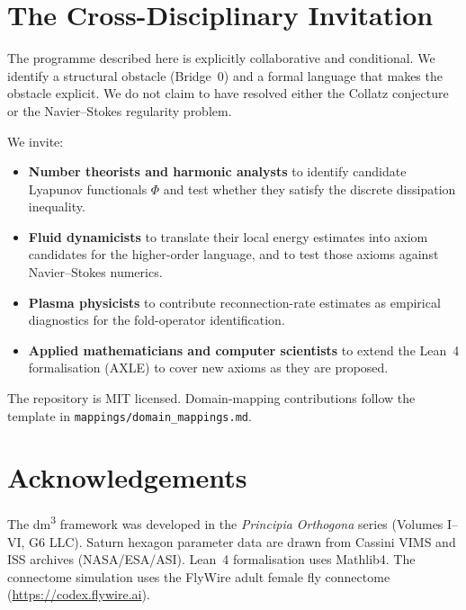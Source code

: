 \documentclass[11pt,a4paper]{article}
\begin{document}
\section{The Cross-Disciplinary Invitation}

The programme described here is explicitly collaborative and conditional.
We identify a structural obstacle (Bridge~0) and a formal language that
makes the obstacle explicit.  We do not claim to have resolved either
the Collatz conjecture or the Navier--Stokes regularity problem.

We invite:

\begin{itemize}
  \item \textbf{Number theorists and harmonic analysts} to identify
        candidate Lyapunov functionals $\Phi$ and test whether they
        satisfy the discrete dissipation inequality.
  \item \textbf{Fluid dynamicists} to translate their local energy
        estimates into axiom candidates for the higher-order language,
        and to test those axioms against Navier--Stokes numerics.
  \item \textbf{Plasma physicists} to contribute reconnection-rate
        estimates as empirical diagnostics for the fold-operator
        identification.
  \item \textbf{Applied mathematicians and computer scientists} to
        extend the Lean~4 formalisation (AXLE) to cover new axioms as
        they are proposed.
\end{itemize}

The repository is MIT licensed.  Domain-mapping contributions follow
the template in \texttt{mappings/domain\_mappings.md}.

\section*{Acknowledgements}

The dm\textsuperscript{3} framework was developed in the \emph{Principia
Orthogona} series (Volumes I--VI, G6 LLC).  Saturn hexagon parameter
data are drawn from Cassini VIMS and ISS archives (NASA/ESA/ASI).
Lean~4 formalisation uses Mathlib4.  The connectome simulation uses the
FlyWire adult female fly connectome (\url{https://codex.flywire.ai}).
\end{document}
